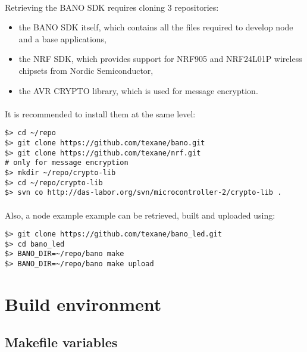 \documentclass[a4paper, 11pt]{article}
\begin{document}
\paragraph{}
Retrieving the BANO SDK requires cloning 3 repositories:
\begin{itemize}
\item the BANO SDK itself, which contains all the files required
to develop node and a base applications,
\item the NRF SDK, which provides support for NRF905 and NRF24L01P
wireless chipsets from Nordic Semiconductor,
\item the AVR CRYPTO library, which is used for message encryption.
\end{itemize}

\paragraph{}
It is recommended to install them at the same level:
\begin{scriptsize}
\begin{verbatim}
$> cd ~/repo
$> git clone https://github.com/texane/bano.git
$> git clone https://github.com/texane/nrf.git
# only for message encryption
$> mkdir ~/repo/crypto-lib
$> cd ~/repo/crypto-lib
$> svn co http://das-labor.org/svn/microcontroller-2/crypto-lib .
\end{verbatim}
\end{scriptsize}

\paragraph{}
Also, a node example example can be retrieved, built and uploaded
using:
\begin{scriptsize}
\begin{verbatim}
$> git clone https://github.com/texane/bano_led.git
$> cd bano_led
$> BANO_DIR=~/repo/bano make
$> BANO_DIR=~/repo/bano make upload
\end{verbatim}
\end{scriptsize}

\clearpage
\section{Build environment}

\subsection{Makefile variables}
\end{document}
